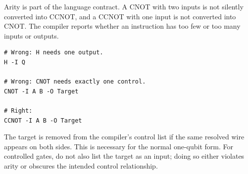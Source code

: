 Arity is part of the language contract. A CNOT with two inputs is not silently
converted into CCNOT, and a CCNOT with one input is not converted into CNOT.
The compiler reports whether an instruction has too few or too many inputs or
outputs.

\begin{lstlisting}
# Wrong: H needs one output.
H -I Q

# Wrong: CNOT needs exactly one control.
CNOT -I A B -O Target

# Right:
CCNOT -I A B -O Target
\end{lstlisting}

The target is removed from the compiler's control list if the same resolved
wire appears on both sides. This is necessary for the normal one-qubit form.
For controlled gates, do not also list the target as an input; doing so either
violates arity or obscures the intended control relationship.

